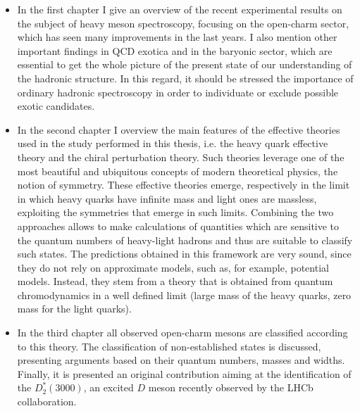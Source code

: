 \begin{itemize}
  \item In the first chapter I give an overview of the recent experimental results on the subject of heavy meson spectroscopy, focusing on the open-charm sector, which has seen many improvements in the last years. I also mention other important findings in QCD exotica and in the baryonic sector, which are essential to get the whole picture of the present state of our understanding of the hadronic structure. In this regard, it should be stressed the importance of ordinary hadronic spectroscopy in order to individuate or exclude possible exotic candidates.
  \item In the second chapter I overview the main features of the effective theories used in the study performed in this thesis, i.e. the heavy quark effective theory and the chiral perturbation theory. Such theories leverage one of the most beautiful and ubiquitous concepts of modern theoretical physics, the notion of symmetry. These effective theories emerge, respectively in the limit in which heavy quarks have infinite mass and light ones are massless, exploiting the symmetries that emerge in such limits. Combining the two approaches allows to make calculations of quantities which are sensitive to the quantum numbers of heavy-light hadrons and thus are suitable to classify such states. The predictions obtained in this framework are very sound, since they do not rely on approximate models, such as, for example, potential models. Instead, they stem from a theory that is obtained from quantum chromodynamics in a well defined limit (large mass of the heavy quarks, zero mass for the light quarks).
  \item In the third chapter all observed open-charm mesons are classified according to this theory. The classification of non-established states is discussed, presenting arguments based on their quantum numbers, masses and widths. Finally, it is presented an original contribution aiming at the identification of the $D^*_2(3000)$, an excited $D$ meson recently observed by the LHCb collaboration.
\end{itemize}

